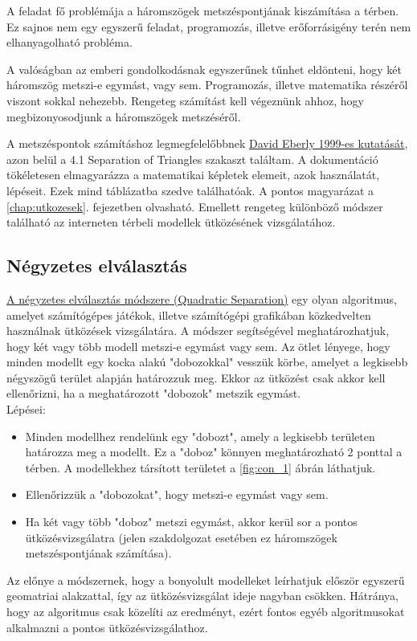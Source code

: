 
A feladat fő problémája a háromszögek metszéspontjának kiszámítása a térben. Ez sajnos nem egy egyszerű feladat, programozás, illetve erőforrásigény terén nem elhanyagolható probléma.

A valóságban az emberi gondolkodásnak egyszerűnek tűnhet eldönteni, hogy két háromszög metszi-e egymást, vagy sem. Programozás, illetve matematika részéről viszont sokkal nehezebb. Rengeteg számítást kell végeznünk ahhoz, hogy megbizonyosodjunk a háromszögek metszéséről.

A metszéspontok számításhoz legmegfelelőbbnek \href{https://www.geometrictools.com/Documentation/DynamicCollisionDetection.pdf}{David Eberly 1999-es kutatását}, azon belül a 4.1 Separation of Triangles \cite{triangles} szakaszt találtam. A dokumentáció tökéletesen elmagyarázza a matematikai képletek elemeit, azok használatát, lépéseit. Ezek mind táblázatba szedve találhatóak. A pontos magyarázat a \ref{chap:utkozesek}. fejezetben olvasható. Emellett rengeteg különböző módszer található az interneten térbeli modellek ütközésének vizsgálatához.\\
\newpage
\subsection{Négyzetes elválasztás}
\label{chap:quad}
\href{https://developer.mozilla.org/en-US/docs/Games/Techniques/3D_collision_detection}{A négyzetes elválasztás módszere (Quadratic Separation)} \cite{quad} egy olyan algoritmus, amelyet számítógépes játékok, illetve számítógépi grafikában közkedvelten használnak ütközések vizsgálatára.
A módszer segítségével meghatározhatjuk, hogy két vagy több modell metszi-e egymást vagy sem.
Az ötlet lényege, hogy minden modellt egy kocka alakú "dobozokkal" vesszük körbe, amelyet a legkisebb négyszögű terület alapján határozzuk meg. Ekkor az ütközést csak akkor kell ellenőrizni, ha a meghatározott "dobozok" metszik egymást.\\
Lépései:
\begin{itemize}
\item Minden modellhez rendelünk egy "dobozt", amely a legkisebb területen határozza meg a modellt. Ez a "doboz" könnyen meghatározható 2 ponttal a térben. A modellekhez társított területet a \ref{fig:con_1} ábrán láthatjuk.

\item Ellenőrizzük a "dobozokat", hogy metszi-e egymást vagy sem.

\item Ha két vagy több "doboz" metszi egymást, akkor kerül sor a pontos ütközésvizsgálatra (jelen szakdolgozat esetében ez háromszögek metszéspontjának számítása).
\end{itemize}
Az előnye a módszernek, hogy a bonyolult modelleket leírhatjuk először egyszerű geomatriai alakzattal, így az ütközésvizsgálat ideje nagyban csökken. Hátránya, hogy az algoritmus csak közelíti az eredményt, ezért fontos egyéb algoritmusokat alkalmazni a pontos ütközésvizsgálathoz.

